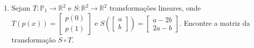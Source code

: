\documentclass[a4paper,12pt]{article}
\begin{document}
\begin{enumerate}
    $$ B = \{(a,1,0),\ (1,a,1),\ (0,1,a)\}.$$
    \item Sejam $T: \mathbb{P}_1 \to \mathbb{R}^2$ e $S: \mathbb{R}^2 \to \mathbb{R}^2$ transformações lineares, onde $T(p(x)) = \begin{bmatrix} p(0) \\ p(1) \end{bmatrix}$ e $S\left(\begin{bmatrix} a \\ b \end{bmatrix}\right) = \begin{bmatrix} a - 2b \\ 2a - b \end{bmatrix}$. Encontre a matriz da transformação $S \circ T$.


\end{enumerate}
\end{document}
